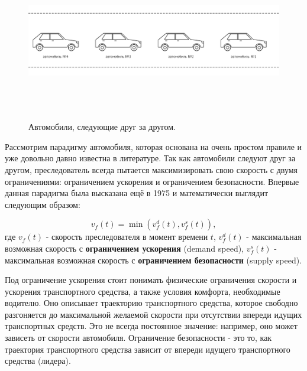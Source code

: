 \documentclass[12pt, a4paper]{extarticle}
\numberwithin{equation}{section}
\begin{document}
\begin{figure}[h!]  
	\begin{center}
		\includegraphics[keepaspectratio,width=160mm,height=70mm]{Images/car_following.png}
	\end{center}
	\caption{Автомобили, следующие друг за другом.}
	\label{car_following}
\end{figure}

Рассмотрим парадигму автомобиля, которая основана на очень простом правиле и уже довольно давно известна в литературе. Так как автомобили следуют друг за другом, преследователь всегда пытается максимизировать свою скорость с двумя ограничениями: ограничением ускорения и ограничением безопасности. Впервые данная парадигма была высказана ещё в 1975 \cite{GippsModel} и математически выглядит следующим образом:

\begin{equation} \label{following_paradigm}
v_f(t) = \min(v_f^d(t), v_f^s(t)),
\end{equation}
где $v_f(t)$ - скорость преследователя в момент времени $t$, $v_f^d(t)$ - максимальная возможная скорость с \textbf{ограничением ускорения} (demand speed), $v_f^s(t)$ - максимальная возможная скорость с \textbf{ограничением безопасности} (supply speed).

Под ограничение ускорения стоит понимать физические ограничения скорости и ускорения транспортного средства, а также условия комфорта, необходимые водителю. Оно описывает траекторию транспортного средства, которое свободно разгоняется до максимальной желаемой скорости при отсутствии впереди идущих транспортных средств. Это не всегда постоянное значение: например, оно может зависеть от скорости автомобиля. Ограничение безопасности - это то, как траектория транспортного средства зависит от впереди идущего транспортного средства (лидера).
\end{document}
